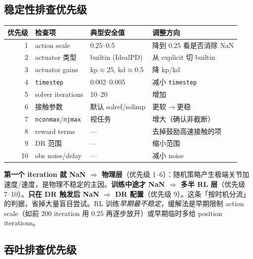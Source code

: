 \subsection{稳定性排查优先级}

\begin{center}
\small
\begin{tabular}{@{}rlll@{}}
\toprule
优先级 & 检查项 & 典型安全值 & 调整方向 \\
\midrule
1 & action scale & 0.25--0.5 & 降到 0.25 看是否消除 NaN \\
2 & actuator 类型 & builtin (IdealPD) & 从 explicit 切 builtin \\
3 & actuator gains & kp$\approx$25, kd$\approx$0.5 & 降 kp/kd \\
4 & \verb|timestep| & 0.002--0.005 & 减小 \verb|timestep| \\
5 & solver iterations & 10--20 & 增加 \\
6 & 接触参数 & 默认 solref/solimp & 更软$\to$更稳 \\
7 & \verb|nconmax|/\allowbreak\verb|njmax| & 视任务 & 增大（确认非截断） \\
8 & reward terms & — & 去掉鼓励高速接触的项 \\
9 & DR 范围 & — & 缩小范围 \\
10 & obs noise/delay & — & 减小 noise \\
\bottomrule
\end{tabular}
\end{center}

\begin{insight}\label{ins:rlmc-phys-nan}
\textbf{第一个 iteration 就 NaN $\Rightarrow$ 物理层}（优先级 1--6）：随机策略产生极端关节加速度/速度，是物理不稳定的主因。\textbf{训练中途才 NaN $\Rightarrow$ 多半 RL 层}（优先级 7--10）。\textbf{只在 DR 触发后 NaN $\Rightarrow$ DR 配置}（优先级 9）。这条「按时机分流」的判据，省掉大量盲目尝试。RL 训练\emph{早期最不稳定}，缓解法是早期限制 action scale（如前 200 iteration 用 0.25 再逐步放开）或早期临时多给 position iterations。
\end{insight}

\subsection{吞吐排查优先级}

